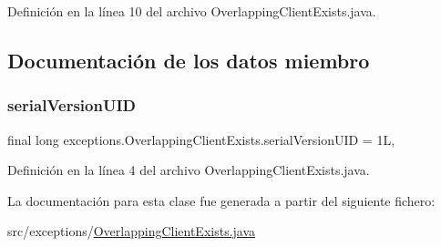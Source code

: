 Definición en la línea 10 del archivo Overlapping\+Client\+Exists.\+java.


\begin{DoxyCode}{0}

\end{DoxyCode}


\subsection{Documentación de los datos miembro}
\mbox{\label{classexceptions_1_1_overlapping_client_exists_a9e613393e0b8e7a6dfe0ac3ad3b8f923}} 
\subsubsection{\texorpdfstring{serialVersionUID}{serialVersionUID}}
{\footnotesize\ttfamily final long exceptions.\+Overlapping\+Client\+Exists.\+serial\+Version\+U\+ID = 1L\hspace{0.3cm}{\ttfamily [static]}, {\ttfamily [private]}}



Definición en la línea 4 del archivo Overlapping\+Client\+Exists.\+java.



La documentación para esta clase fue generada a partir del siguiente fichero\+:\begin{DoxyCompactItemize}
\item 
src/exceptions/\mbox{\hyperlink{_overlapping_client_exists_8java}{Overlapping\+Client\+Exists.\+java}}\end{DoxyCompactItemize}
